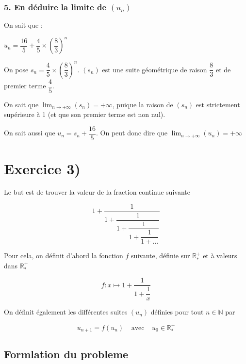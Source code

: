\documentclass[]{scrartcl}
\begin{document}
\hypertarget{en-duxe9duire-la-limite-de-u_n}{%
\subsubsection{\texorpdfstring{5. En déduire la limite de
\((u_n)\)}{5. En déduire la limite de (u\_n)}}\label{en-duxe9duire-la-limite-de-u_n}}

On sait que :

\(u_n = \dfrac{16}{5} + \dfrac{4}{5}\times \left(\dfrac{8}{3}\right)^{n}\)

On pose \(s_n = \dfrac{4}{5}\times \left(\dfrac{8}{3}\right)^{n}\).
\((s_n)\) est une suite géométrique de raison \(\dfrac{8}{3}\) et de
premier terme \(\dfrac{4}{5}\).

On sait que \(\lim_{n\rightarrow +\infty}(s_n) = +\infty\), puique la
raison de \((s_n)\) est strictement supérieure à 1 (et que son premier
terme est non nul).

On sait aussi que \(u_n = s_n +\dfrac{16}{5}\). On peut donc dire que
\(\lim_{n\rightarrow +\infty}(u_n) = +\infty\)

\newpage{}

\hypertarget{exercice-3}{%
\section{Exercice 3)}\label{exercice-3}}

Le but est de trouver la valeur de la fraction continue suivante

\[1 + \dfrac{1}{1 + \dfrac{1}{1 + \dfrac{1}{1 + \dfrac{1}{1 + …}}}}\]

\vspace*{2cm}{}

Pour cela, on définit d'abord la fonction \(f\) suivante, définie sur
\(\mathbb{R}^+_*\) et à valeurs dans \(\mathbb{R}^+_*\)

\[f : x \mapsto 1 + \dfrac{1}{1 + \dfrac{1}{x}}\]

\vspace*{2cm}{}

On définit également les différentes suites \((u_n)\) définies pour tout
\(n \in \mathbb{N}\) par

\[u_{n+1} = f(u_n) \;\;\;\;\text{avec} \;\;\;\;u_0 \in \mathbb{R}^+_*\]

\vspace*{2cm}{}

\hypertarget{formlation-du-probleme}{%
\subsection{Formlation du probleme}\label{formlation-du-probleme}}
\end{document}
